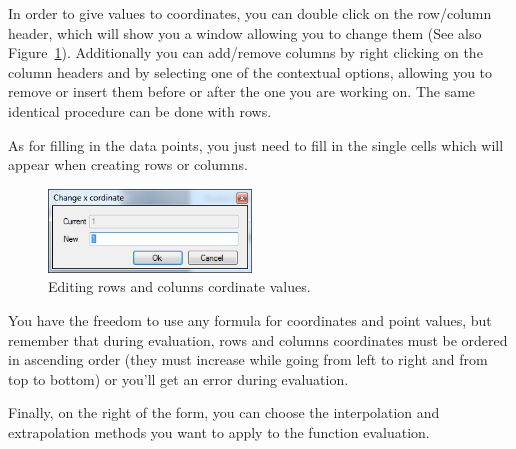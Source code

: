 In order to give values to coordinates, you can double click on the row/column header, which will show you a window allowing you to change them (See also Figure~\ref{fig.PFunction2DColumnEdit}). Additionally you can add/remove columns by right clicking on the column headers and by selecting one of the contextual options, allowing you to remove or insert them before or after the one you are working on. The same identical procedure can be done with rows.

As for filling in the data points, you just need to fill in the single cells which will appear when creating rows or columns.

\begin{figure}[h]
\begin{center}
\includegraphics[width=0.48\textwidth]{./images/PFunction2DColumnEdit.png}
\caption{Editing rows and colunns cordinate values.}
\label{fig.PFunction2DColumnEdit}
\end{center}
\end{figure}

You have the freedom to use any formula for coordinates and point values, but remember that during evaluation, rows and columns coordinates must be ordered in ascending order (they must increase while going from left to right and from top to bottom) or you'll get an error during evaluation.

Finally, on the right of the form, you can choose the interpolation and extrapolation methods you want to apply to the function evaluation.


